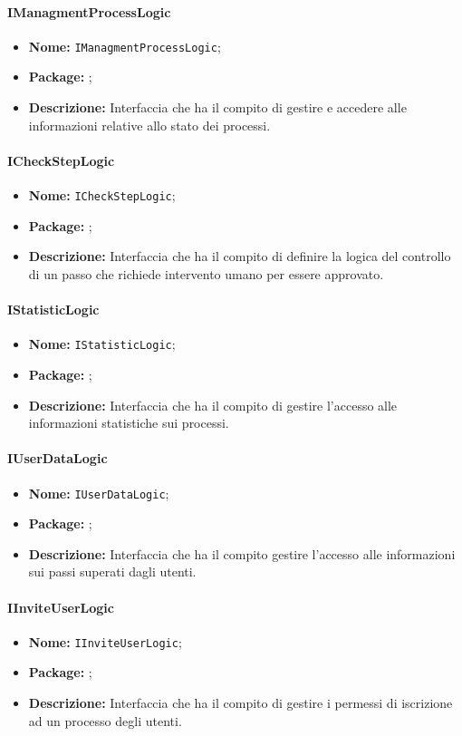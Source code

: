 \paragraph{IManagmentProcessLogic}

\begin{itemize}
\item \textbf{Nome:} \texttt{IManagmentProcessLogic};
\item \textbf{Package:} \texttt{\iLogicAdmin{}};
\item \textbf{Descrizione:} Interfaccia che ha il compito di gestire e accedere alle informazioni relative allo stato dei processi.
\end{itemize}


\paragraph{ICheckStepLogic}
\begin{itemize}
\item \textbf{Nome:} \texttt{ICheckStepLogic};
\item \textbf{Package:} \texttt{\iLogicAdmin{}};
\item \textbf{Descrizione:} Interfaccia che ha il compito di definire la logica del controllo di un passo che richiede intervento umano per essere approvato.
\end{itemize}


\paragraph{IStatisticLogic}
\begin{itemize}
\item \textbf{Nome:} \texttt{IStatisticLogic};
\item \textbf{Package:} \texttt{\iLogicAdmin{}};
\item \textbf{Descrizione:} Interfaccia che ha il compito di gestire l'accesso alle informazioni statistiche sui processi.
\end{itemize}


\paragraph{IUserDataLogic}
\begin{itemize}
\item \textbf{Nome:} \texttt{IUserDataLogic};
\item \textbf{Package:} \texttt{\iLogicAdmin{}};
\item \textbf{Descrizione:} Interfaccia che ha il compito gestire l'accesso alle informazioni sui passi superati dagli utenti.
\end{itemize}


\paragraph{IInviteUserLogic}
\begin{itemize}
\item \textbf{Nome:} \texttt{IInviteUserLogic};
\item \textbf{Package:} \texttt{\iLogicAdmin{}};
\item \textbf{Descrizione:} Interfaccia che ha il compito di gestire i permessi di iscrizione ad un processo degli utenti.
\end{itemize}
